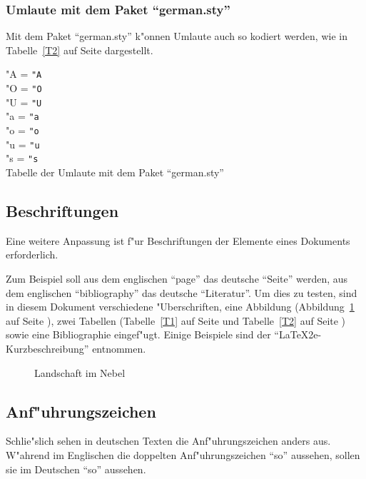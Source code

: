 \documentclass[11pt]{article} %
\begin{document}
\subsubsection{Umlaute mit dem Paket "`german.sty"'}
Mit dem Paket "`german.sty"' k"onnen Umlaute auch so kodiert werden, wie
in Tabelle~\ref{T2} auf Seite \pageref{T2} dargestellt.
\begin{table}[ht]
"A = \verb|"A|\\
"O = \verb|"O|\\
"U = \verb|"U|\\
"a = \verb|"a|\\
"o = \verb|"o|\\
"u = \verb|"u|\\
"s = \verb|"s|\\
\caption{Tabelle der Umlaute mit dem Paket "`german.sty"'} 
\label{T2}
\end{table}

\subsection{Beschriftungen}

Eine weitere Anpassung ist f"ur Beschriftungen der Elemente eines
Dokuments erforderlich. 

Zum Beispiel soll aus dem englischen "`page"' das deutsche "`Seite"'
werden, aus dem englischen "`bibliography"' das deutsche "`Literatur"'.
Um dies zu testen, sind in diesem Dokument verschiedene "Uberschriften,
eine Abbildung (Abbildung~\ref{A1} auf Seite \pageref{A1}), zwei
Tabellen (Tabelle~\ref{T1} auf Seite \pageref{T1} und Tabelle~\ref{T2}
auf Seite \pageref{T2}) sowie eine Bibliographie eingef"ugt. Einige
Beispiele sind der "`LaTeX2e-Kurzbeschreibung"' \cite{l2kurz} entnommen.


\begin{figure}[tb]
\vspace{4cm}
\caption{Landschaft im Nebel} 
\label{A1}
\end{figure}

\subsection{Anf"uhrungszeichen}

Schlie"slich sehen in deutschen Texten die Anf"uhrungszeichen anders
aus. W"ahrend im Englischen die doppelten Anf"uhrungszeichen ``so''
aussehen, sollen sie im Deutschen "`so"' aussehen. 
\end{document}
